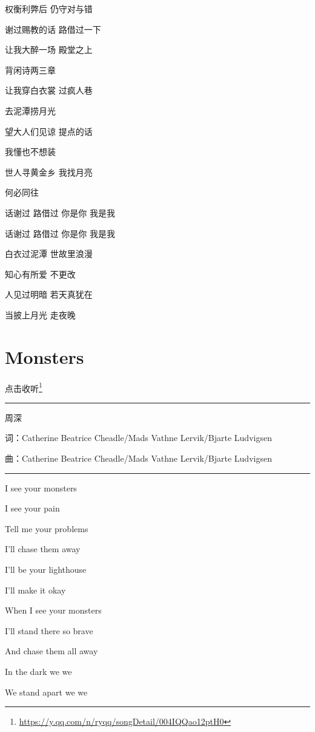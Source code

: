 \documentclass[]{ctexbook}
\renewcommand{\href}[2]{#2\footnote{\url{#1}}}
\begin{document}
权衡利弊后 仍守对与错

谢过赐教的话 路借过一下

让我大醉一场 殿堂之上

背闲诗两三章

让我穿白衣裳 过疯人巷

去泥潭捞月光

望大人们见谅 提点的话

我懂也不想装

世人寻黄金乡 我找月亮

何必同往

话谢过 路借过 你是你 我是我

话谢过 路借过 你是你 我是我

白衣过泥潭 世故里浪漫

知心有所爱 不更改

人见过明暗 若天真犹在

当披上月光 走夜晚

\section*{Monsters}\label{Monsters}


\href{https://y.qq.com/n/ryqq/songDetail/004IQQao12ptH0}{点击收听}

\begin{center}\rule{0.5\linewidth}{0.5pt}\end{center}

周深

词：Catherine Beatrice Cheadle/Mads Vathne Lervik/Bjarte Ludvigsen

曲：Catherine Beatrice Cheadle/Mads Vathne Lervik/Bjarte Ludvigsen

\begin{center}\rule{0.5\linewidth}{0.5pt}\end{center}

I see your monsters

I see your pain

Tell me your problems

I'll chase them away

I'll be your lighthouse

I'll make it okay

When I see your monsters

I'll stand there so brave

And chase them all away

In the dark we we

We stand apart we we
\end{document}
